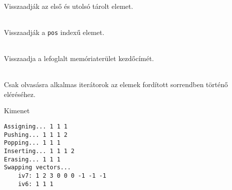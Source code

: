 \begin{frame}
    \begin{description}[m]
        \item[\hiv{\href{https://en.cppreference.com/w/cpp/container/vector/front}{\texttt{front()}}}, \hiv{\href{https://en.cppreference.com/w/cpp/container/vector/back}{\texttt{back()}}}] \hfill \\ Visszaadják az első és utolsó tárolt elemet.
        \item[\hiv{\href{https://en.cppreference.com/w/cpp/container/vector/operator_at}{\texttt{operator[](pos)}}}, \hiv{\href{https://en.cppreference.com/w/cpp/container/vector/at}{\texttt{at(pos)}}}] \hfill \\ Visszaadják a \texttt{pos} indexű elemet.
        \item[\hiv{\href{https://en.cppreference.com/w/cpp/container/vector/data}{\texttt{data()}}}] \hfill \\ Visszaadja a lefoglalt memóriaterület kezdőcímét.
        \item[\hiv{\href{https://en.cppreference.com/w/cpp/container/vector/rbegin}{\texttt{crbegin()}}}, \hiv{\href{https://en.cppreference.com/w/cpp/container/vector/rend}{\texttt{crend()}}}] \hfill \\ Csak olvasásra alkalmas iterátorok az elemek fordított sorrendben történő eléréséhez.
    \end{description}
\end{frame}

\begin{frame}
    \begin{exampleblock}{}
        \scriptsize
        
    \end{exampleblock}
\end{frame}

\begin{frame}[fragile]
    \begin{block}{Kimenet}
        \vspace{-.4cm}
        \begin{verbatim}
Assigning... 1 1 1 
Pushing... 1 1 1 2 
Popping... 1 1 1 
Inserting... 1 1 1 2 
Erasing... 1 1 1 
Swapping vectors...
    iv7: 1 2 3 0 0 0 -1 -1 -1 
    iv6: 1 1 1         
\end{verbatim}
        \vspace{-.3cm}
    \end{block}
\end{frame}

